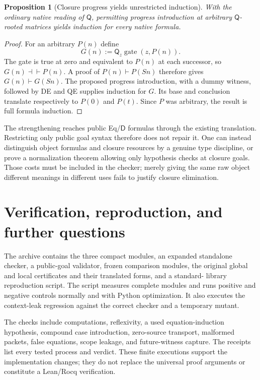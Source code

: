 \documentclass[11pt,letterpaper]{article}
\newtheorem{proposition}[theorem]{Proposition}
\theoremstyle{definition}\newtheorem{definition}[theorem]{Definition}
\theoremstyle{remark}\newtheorem{remark}[theorem]{Remark}
\newcommand{\Q}{\mathsf Q}
\newcommand{\D}{\mathsf D}
\begin{document}
\begin{proposition}[Closure progress yields unrestricted induction]
With the ordinary native reading of $\Q$, permitting progress introduction
at arbitrary $\Q$-rooted matrices yields induction for every native formula.
\end{proposition}
\begin{proof}
For an arbitrary $P(n)$ define
\[
 G(n):=\Q_z\operatorname{gate}(z,P(n)).
\]
The gate is true at zero and equivalent to $P(n)$ at each successor, so
$G(n)\dashv\vdash P(n)$. A proof of $P(n)\vdash P(Sn)$ therefore gives
$G(n)\vdash G(Sn)$. The proposed progress introduction, with a dummy
witness, followed by DE and QE supplies induction for $G$. Its base and
conclusion translate respectively to $P(0)$ and $P(t)$. Since $P$ was
arbitrary, the result is full formula induction.
\end{proof}

The strengthening reaches public Eq/$\D$ formulas through the existing
translation. Restricting only public goal syntax therefore does not repair
it. One can instead distinguish object formulas and closure resources by a
genuine type discipline, or prove a normalization theorem allowing only
hypothesis checks at closure goals. Those costs must be included in the
checker; merely giving the same raw object different meanings in different
uses fails to justify closure elimination.

\section{Verification, reproduction, and further questions}
\label{sec:verification}

The archive contains the three compact modules, an expanded standalone
checker, a public-goal validator, frozen comparison modules, the original
global and local certificates and their translated forms, and a standard-
library reproduction script. The script measures complete modules and runs
positive and negative controls normally and with Python optimization.
It also executes the context-leak regression against the correct checker
and a temporary mutant.



The checks include computations, reflexivity, a used equation-induction
hypothesis, compound case introduction, zero-source transport, malformed
packets, false equations, scope leakage, and future-witness capture. The
receipts list every tested process and verdict. These finite executions
support the implementation changes; they do not replace the universal
proof arguments or constitute a Lean/Rocq verification.
\end{document}
